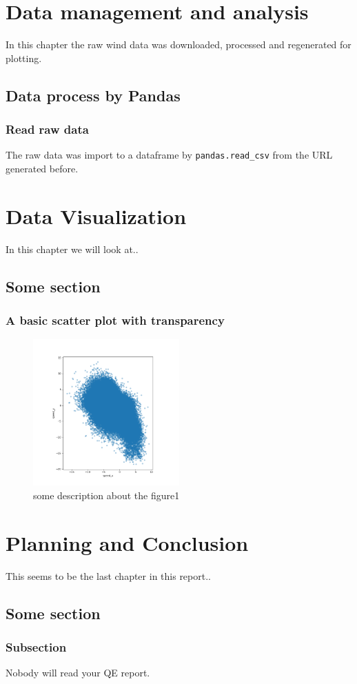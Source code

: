 \documentclass[10pt]{report}
\begin{document}
\chapter{Data management and analysis}
In this chapter the raw wind data was downloaded, processed and regenerated for plotting.

\section{Data process by Pandas}

\subsection{Read raw data}
The raw data was import to a dataframe by \texttt{pandas.read\_csv} from the URL generated before.

 \chapter{Data Visualization}
 In this chapter we will look at..

\section{Some section}

\subsection{A basic scatter plot with transparency}

\begin{figure}[h!]
    \centering
    \includegraphics[width=0.50\textwidth]{images/figure1.png}
    \caption{some description about the figure1}
    \label{fig: PaleBlueDot}    
\end{figure}
 
 \chapter{Planning and Conclusion}
 This seems to be the last chapter in this report..

\section{Some section}

\subsection{Subsection}
Nobody will read your QE report.


\printbibliography
\end{document}
